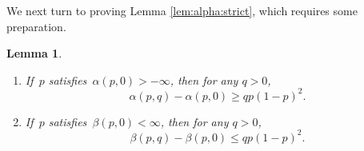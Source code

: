 \documentclass[pdflatex,sn-mathphys-num]{sn-jnl}%
\newcommand{\1}{{\ensuremath{\mathbf{1}}} }
\theoremstyle{thmstyleone}%
\newtheorem{lemma}[theorem]{Lemma}%
\theoremstyle{thmstyletwo}%
\theoremstyle{thmstylethree}%
\begin{document}
We next turn to proving Lemma \ref{lem:alpha:strict}, which requires some preparation.
\begin{lemma}
\label{lem_monotone_alpha}\leavevmode
		\begin{enumerate}
			\item If~$p$ satisfies~$\alpha(p,0) > - \infty$, then for any $q>0$,
				\begin{equation}
					\label{eq_alpha_mon}
				\alpha(p,q) - \alpha(p,0) \ge qp(1-p)^2.
				\end{equation}
			\item If~$p$ satisfies~$\beta(p,0) < \infty$, then for any $q>0$,
				\begin{equation}
					\label{eq_beta_mon}
					\beta(p,q) - \beta(p,0) \le qp(1-p)^2.
				\end{equation}
	\end{enumerate}
\end{lemma}
\end{document}
